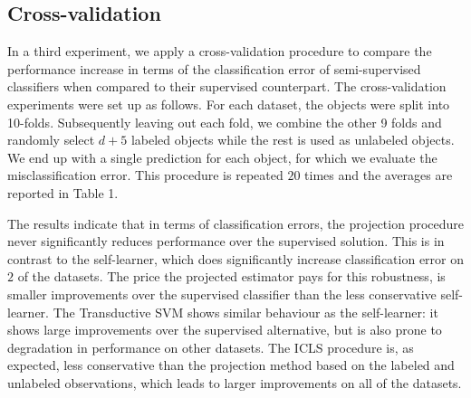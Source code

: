 \documentclass[smallcondensed]{svjour3}\usepackage[]{graphicx}\usepackage[]{color}
\begin{document}
\subsection{Cross-validation}
In a third experiment, we apply a cross-validation procedure to compare the performance increase in terms of the classification error of semi-supervised classifiers when compared to their supervised counterpart. The cross-validation experiments were set up as follows. For each dataset, the objects were split into 10-folds. Subsequently leaving out each fold, we combine the other 9 folds and randomly select $d+5$ labeled objects while the rest is used as unlabeled objects. We end up with a single prediction for each object, for which we evaluate the misclassification error. This procedure is repeated $20$ times and the averages are reported in Table 1.

The results indicate that in terms of classification errors, the projection procedure never significantly reduces performance over the supervised solution. This is in contrast to the self-learner, which does significantly increase classification error on $2$ of the datasets. The price the projected estimator pays for this robustness, is smaller improvements over the supervised classifier than the less conservative self-learner. The Transductive SVM shows similar behaviour as the self-learner: it shows large improvements over the supervised alternative, but is also prone to degradation in performance on other datasets. The ICLS procedure is, as expected, less conservative than the projection method based on the labeled and unlabeled observations, which leads to larger improvements on all of the datasets.
\end{document}
